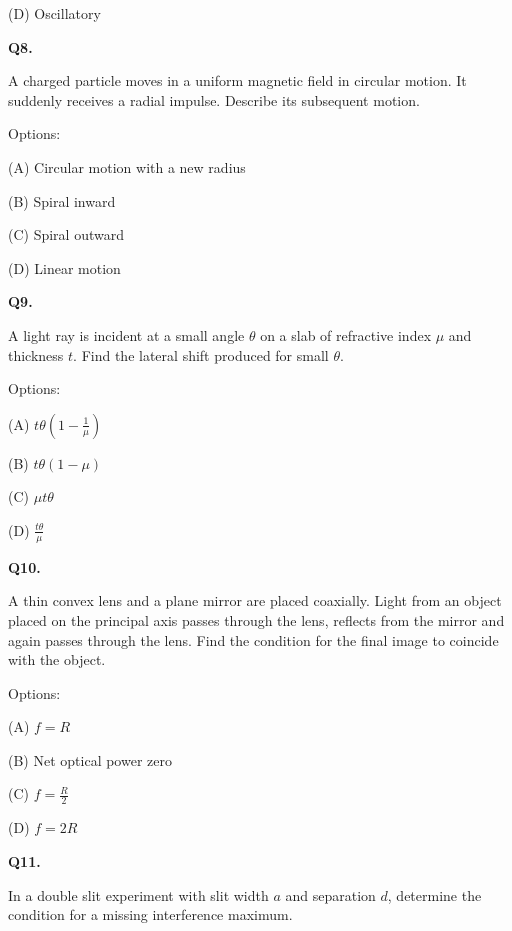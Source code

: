 \documentclass[12pt]{article}
\begin{document}
(D) Oscillatory

\vspace{0.7cm}

\textbf{Q8.}

A charged particle moves in a uniform magnetic field in circular motion. 
It suddenly receives a radial impulse. 
Describe its subsequent motion.

Options:

(A) Circular motion with a new radius

(B) Spiral inward

(C) Spiral outward

(D) Linear motion

\vspace{0.7cm}

\textbf{Q9.}

A light ray is incident at a small angle $\theta$ on a slab of refractive index $\mu$ 
and thickness $t$. 
Find the lateral shift produced for small $\theta$.

Options:

(A) $t\theta\left(1-\frac{1}{\mu}\right)$

(B) $t\theta(1-\mu)$

(C) $\mu t\theta$

(D) $\frac{t\theta}{\mu}$

\vspace{0.7cm}

\textbf{Q10.}

A thin convex lens and a plane mirror are placed coaxially. 
Light from an object placed on the principal axis passes through the lens, 
reflects from the mirror and again passes through the lens. 
Find the condition for the final image to coincide with the object.

Options:

(A) $f = R$

(B) Net optical power zero

(C) $f = \frac{R}{2}$

(D) $f = 2R$

\vspace{0.7cm}

\textbf{Q11.}

In a double slit experiment with slit width $a$ and separation $d$, 
determine the condition for a missing interference maximum.
\end{document}
